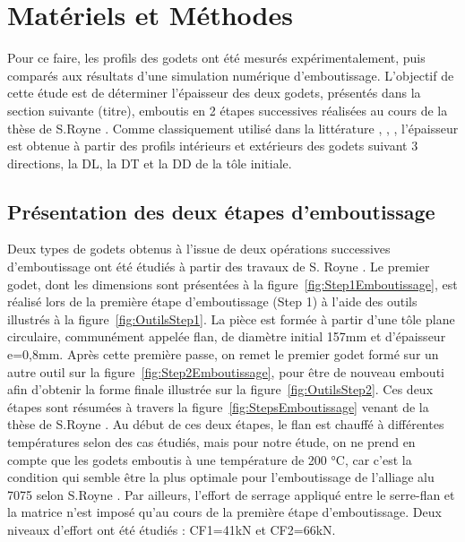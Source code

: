 \documentclass[14pt]{extarticle}
\begin{document}
\section{Matériels et Méthodes}
Pour ce faire, les profils des godets ont été mesurés expérimentalement, puis comparés aux résultats d’une simulation numérique d’emboutissage.
L’objectif de cette étude est de déterminer l’épaisseur des deux godets, présentés dans la section suivante (titre), emboutis en 2 étapes successives réalisées au cours  de la thèse de S.Royne \cite{royne_etude_2025}. 
Comme classiquement utilisé dans la littérature \cite{coer_mise_nodate}, \cite{lanterne_local_nodate}, \cite{bazylevych_procedure_2008}, l'épaisseur est obtenue à partir des profils intérieurs et extérieurs des godets suivant 3 directions, la DL, la DT et la DD de la tôle initiale.

\subsection{Présentation des deux étapes d'emboutissage}
Deux types de godets obtenus à l’issue de deux opérations successives d’emboutissage ont été étudiés à partir des travaux de S. Royne \cite{royne_etude_2025}.
Le premier godet, dont les dimensions sont présentées à la figure~\ref{fig:Step1Emboutissage}, est réalisé lors de la première étape d’emboutissage (Step 1) à l’aide des outils illustrés à la figure~\ref{fig:OutilsStep1}. La pièce est formée à partir d’une tôle plane circulaire, communément appelée flan, de diamètre initial 157mm et d’épaisseur e=0,8mm.
Après cette première passe, on remet le premier godet formé sur un autre outil sur la figure~\ref{fig:Step2Emboutissage}, pour être de nouveau embouti afin d'obtenir la forme finale illustrée sur la figure~\ref{fig:OutilsStep2}. Ces deux étapes sont résumées à travers la figure~\ref{fig:StepsEmboutissage} venant de la thèse de S.Royne \cite{royne_etude_2025}. Au début de ces deux étapes, le flan est chauffé à différentes températures selon des cas étudiés, mais pour notre étude, on ne prend en compte que les godets emboutis à une température de 200 °C, car c'est la condition qui semble être la plus optimale pour l'emboutissage de l'alliage alu 7075 selon S.Royne \cite{royne_etude_2025}. Par ailleurs, l’effort de serrage appliqué entre le serre-flan et la matrice n’est imposé qu’au cours de la première étape d’emboutissage. Deux niveaux d’effort ont été étudiés : CF1=41kN et CF2=66kN.
\end{document}

